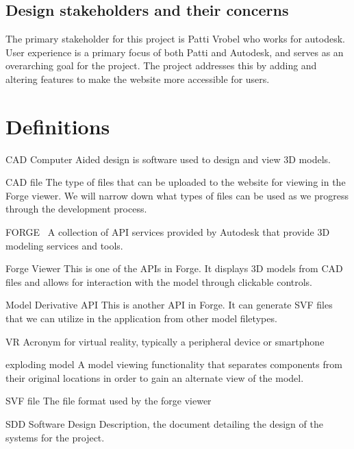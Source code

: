 \documentclass[letterpaper, 10pt, draftclsnofoot, compsoc, onecolumn]{IEEEtran}
\begin{document}
\subsection{Design stakeholders and their concerns}
	The primary stakeholder for this project is Patti Vrobel who works for autodesk. User experience is a primary focus of both Patti and Autodesk, and serves as an overarching goal for the project. The project addresses this by adding and altering features to make the website more accessible for users.




\section{Definitions}
\begin{description}
	\item{CAD} Computer Aided design is software used to design and view 3D models.

	\item{CAD file} The type of files that can be uploaded to the website for viewing in the Forge viewer. 
	We will  narrow down what types of files can be used as we progress through the development process.

	\item{FORGE}~\cite{forge2016} A collection of API services provided by Autodesk that provide 3D modeling services and tools.

	\item{Forge Viewer} This is one of the APIs in Forge. It displays 3D models from CAD files and allows for interaction with the model through clickable controls.
	
	\item{Model Derivative API} This is another API in Forge. It can generate SVF files that we can utilize in the application from other model filetypes.
	
	\item{VR} Acronym for virtual reality, typically a peripheral device or smartphone

	\item{exploding model} A model viewing functionality that separates components from their original locations in order to gain an alternate view of the model.

	\item{SVF file} The file format used by the forge viewer
	
	\item{SDD} Software Design Description, the document detailing the design of the systems for the project.
	
\end{description} 
\end{document}
